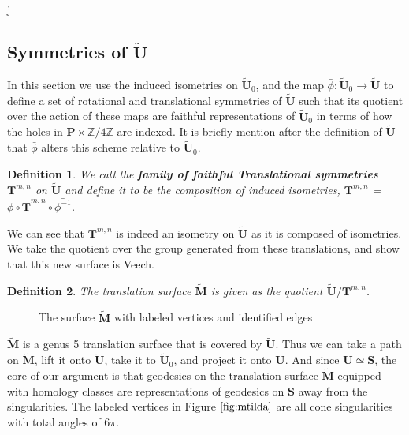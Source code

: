 j\documentclass[]{article}
\newtheorem{Def}{Definition}[subsection]
\begin{document}
\subsection{Symmetries of $\tilde{\mathbf{U}}$}
In this section we use the induced isometries on $\tilde{\mathbf{U}}_0$, and the map $\bar{\phi}:\tilde{\mathbf{U}}_0\rightarrow\tilde{\mathbf{U}}$ to define a set of rotational and translational symmetries of $\tilde{\mathbf{U}}$ such that its quotient over the action of these maps are faithful representations of $\tilde{\mathbf{U}}_0$ in terms of how the holes in $\mathbf{P}\times\mathbb{Z}/4\mathbb{Z}$ are indexed. It is briefly mention after the definition of $\tilde{\mathbf{U}}$ that $\bar{\phi}$ alters this scheme relative to $\tilde{\mathbf{U}}_0$. 

\begin{Def}We call the \textbf{family of faithful Translational symmetries} $\mathbf{T}^{m,n}$ on $\tilde{\mathbf{U}}$ and define it to be the composition of induced isometries, $\mathbf{T}^{m,n}$ = $\bar{\phi}\circ\bar{\mathbf{T}}^{m,n}\circ\bar{\phi^{-1}}$.
\end{Def}

We can see that $\mathbf{T}^{m,n}$ is indeed an isometry on $\tilde{\mathbf{U}}$ as it is composed of isometries. We take the quotient over the group generated from these translations, and show that this new surface is Veech. 

\begin{Def}
The translation surface $\tilde{\mathbf{M}}$ is given as the quotient  $\tilde{\mathbf{U}}/\mathbf{T}^{m,n}$.
\end{Def} 

\begin{figure}[H]
\centering

\caption{The surface $\tilde{\mathbf{M}}$ with labeled vertices and identified edges}
\label{fig:mtilda}
\end{figure}

$\tilde{\mathbf{M}}$ is a genus 5 translation surface that is covered by $\tilde{\mathbf{U}}$. Thus we can take a path on $\tilde{\mathbf{M}}$, lift it onto $\tilde{\mathbf{U}}$, take it to $\tilde{\mathbf{U}}_0$, and project it onto $\mathbf U$. And since $\mathbf{U}\simeq\mathbf{S}$, the core of our argument is that geodesics on the translation surface $\tilde{\mathbf{M}}$ equipped with homology classes are representations of geodesics on $\mathbf{S}$ away from the singularities. The labeled vertices in Figure $\ref{fig:mtilda}$ are all cone singularities with total angles of $6\pi$. 
\end{document}
